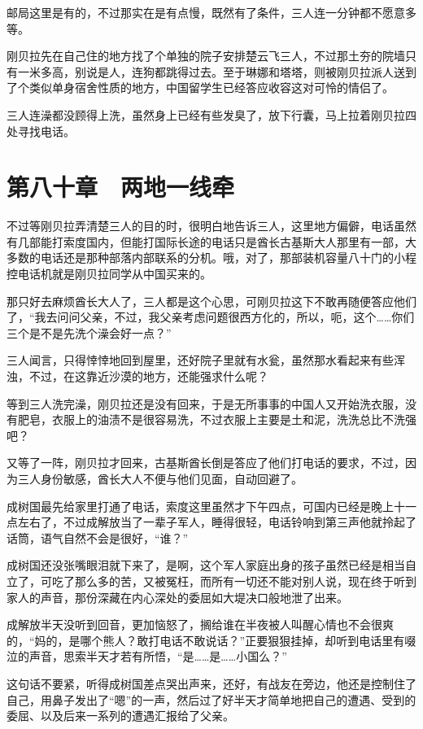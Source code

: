 邮局这里是有的，不过那实在是有点慢，既然有了条件，三人连一分钟都不愿意多等。

刚贝拉先在自己住的地方找了个单独的院子安排楚云飞三人，不过那土夯的院墙只有一米多高，别说是人，连狗都跳得过去。至于琳娜和塔塔，则被刚贝拉派人送到了个类似单身宿舍性质的地方，中国留学生已经答应收容这对可怜的情侣了。

三人连澡都没顾得上洗，虽然身上已经有些发臭了，放下行囊，马上拉着刚贝拉四处寻找电话。

\section{第八十章　两地一线牵}

不过等刚贝拉弄清楚三人的目的时，很明白地告诉三人，这里地方偏僻，电话虽然有几部能打索度国内，但能打国际长途的电话只是酋长古基斯大人那里有一部，大多数的电话还是那种部落内部联系的分机。哦，对了，那部装机容量八十门的小程控电话机就是刚贝拉同学从中国买来的。

那只好去麻烦酋长大人了，三人都是这个心思，可刚贝拉这下不敢再随便答应他们了，“我去问问父亲，不过，我父亲考虑问题很西方化的，所以，呃，这个……你们三个是不是先洗个澡会好一点？”

三人闻言，只得悻悻地回到屋里，还好院子里就有水瓮，虽然那水看起来有些浑浊，不过，在这靠近沙漠的地方，还能强求什么呢？

等到三人洗完澡，刚贝拉还是没有回来，于是无所事事的中国人又开始洗衣服，没有肥皂，衣服上的油渍不是很容易洗，不过衣服上主要是土和泥，洗洗总比不洗强吧？

又等了一阵，刚贝拉才回来，古基斯酋长倒是答应了他们打电话的要求，不过，因为三人身份敏感，酋长大人不便与他们见面，自动回避了。

成树国最先给家里打通了电话，索度这里虽然才下午四点，可国内已经是晚上十一点左右了，不过成解放当了一辈子军人，睡得很轻，电话铃响到第三声他就拎起了话筒，语气自然不会是很好，“谁？”

成树国还没张嘴眼泪就下来了，是啊，这个军人家庭出身的孩子虽然已经是相当自立了，可吃了那么多的苦，又被冤枉，而所有一切还不能对别人说，现在终于听到家人的声音，那份深藏在内心深处的委屈如大堤决口般地泄了出来。

成解放半天没听到回音，更加恼怒了，搁给谁在半夜被人叫醒心情也不会很爽的，“妈的，是哪个熊人？敢打电话不敢说话？”正要狠狠挂掉，却听到电话里有啜泣的声音，思索半天才若有所悟，“是……是……小国么？”

这句话不要紧，听得成树国差点哭出声来，还好，有战友在旁边，他还是控制住了自己，用鼻子发出了“嗯”的一声，然后过了好半天才简单地把自己的遭遇、受到的委屈、以及后来一系列的遭遇汇报给了父亲。

